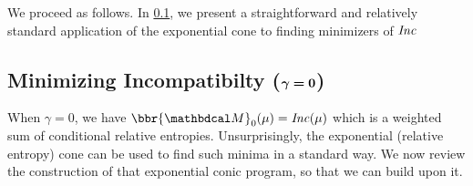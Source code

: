 \documentclass[twoside]{article}
\begin{document}
%



We proceed as follows.
In \cref{sec:minimize-inc}, we present a straightforward
and relatively standard application of the exponential cone to finding minimizers of $\mathit{Inc}$

\subsection{%
    Minimizing Incompatibilty
    (\texorpdfstring{$\boldsymbol\gamma\boldsymbol=\mathbf{0}$}{gamma=0})%
} \label{sec:minimize-inc}

When $\gamma = 0$, we have $\bbr{\dg M}_0(\mu)= \Inc(\mu)$ which is a weighted sum of conditional relative entropies.
Unsurprisingly, the exponential (relative entropy) cone can be used to find such minima in a standard way.
We now review the construction of that exponential conic program,
    so that we can build upon it.
\end{document}
